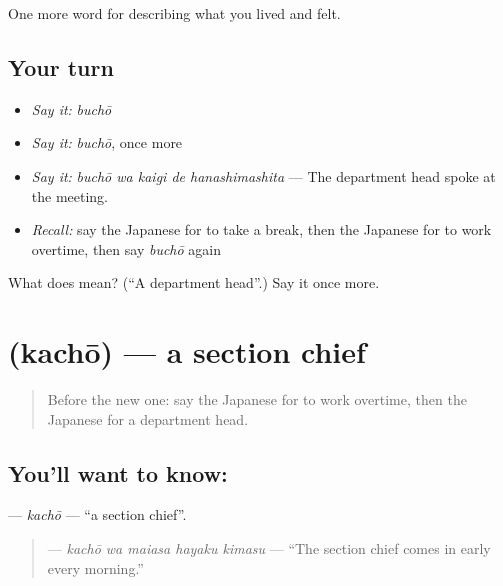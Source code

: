 \begin{grammarlens}[title={What you've built}]
One more word for describing what you lived and felt.
\end{grammarlens}

\subsection*{Your turn}
\begin{itemize}
\raggedright
  \item \emph{Say it:} \emph{buchō}
  \item \emph{Say it:} \emph{buchō}, once more
  \item \emph{Say it:} \emph{buchō wa kaigi de hanashimashita} — The department head spoke at the meeting.
  \item \emph{Recall:} say the Japanese for to take a break, then the Japanese for to work overtime, then say \emph{buchō} again
\end{itemize}

\begin{tcolorbox}[breakable,colback=teal!4,colframe=teal!35!black,title={Before you move on}]
What does  mean? (\textquotedblleft{}A department head\textquotedblright{}.) Say it once more.
\end{tcolorbox}
\section[\texorpdfstring{\ja{かちょう} (kachō)}{かちょう (kachō)}]{ (kachō) — a section chief}

\label{lesson:JA-C452-kachou}



\begin{quote}
Before the new one: say the Japanese for to work overtime, then the Japanese for a department head.
\end{quote}

\subsection*{You'll want to know: }
\textbf{} — \emph{kachō} — \textquotedblleft{}a section chief\textquotedblright{}.

\begin{quote}
\textbf{   } — \emph{kachō wa maiasa hayaku kimasu} — \textquotedblleft{}The section chief comes in early every morning.\textquotedblright{}
\end{quote}

